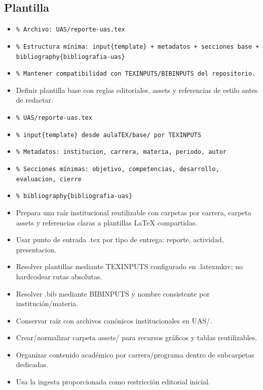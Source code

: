 \documentclass[12pt]{article}
\begin{document}
\subsection*{Plantilla}
\begin{itemize}[leftmargin=*]
  \item \texttt{\% Archivo: UAS/reporte-uas.tex}
  \item \texttt{\% Estructura mínima: input\{template\} + metadatos + secciones base + bibliography\{bibliografia-uas\}}
  \item \texttt{\% Mantener compatibilidad con TEXINPUTS/BIBINPUTS del repositorio.}
  \item Definir plantilla base con reglas editoriales, assets y referencias de estilo antes de redactar.
  \item \texttt{\% UAS/reporte-uas.tex}
  \item \texttt{\% input\{template\} desde aulaTEX/base/ por TEXINPUTS}
  \item \texttt{\% Metadatos: institucion, carrera, materia, periodo, autor}
  \item \texttt{\% Secciones mínimas: objetivo, competencias, desarrollo, evaluacion, cierre}
  \item \texttt{\% bibliography\{bibliografia-uas\}}
  \item Prepara una raíz institucional reutilizable con carpetas por carrera, carpeta assets y referencias claras a plantillas LaTeX compartidas.
  \item Usar punto de entrada .tex por tipo de entrega: reporte, actividad, presentacion.
  \item Resolver plantillas mediante TEXINPUTS configurado en .latexmkrc; no hardcodear rutas absolutas.
  \item Resolver .bib mediante BIBINPUTS y nombre consistente por institución/materia.
  \item Conservar raíz con archivos canónicos institucionales en UAS/.
  \item Crear/normalizar carpeta assets/ para recursos gráficos y tablas reutilizables.
  \item Organizar contenido académico por carrera/programa dentro de subcarpetas dedicadas.
  \item Usa la ingesta proporcionada como restricción editorial inicial.
\end{itemize}
\end{document}

